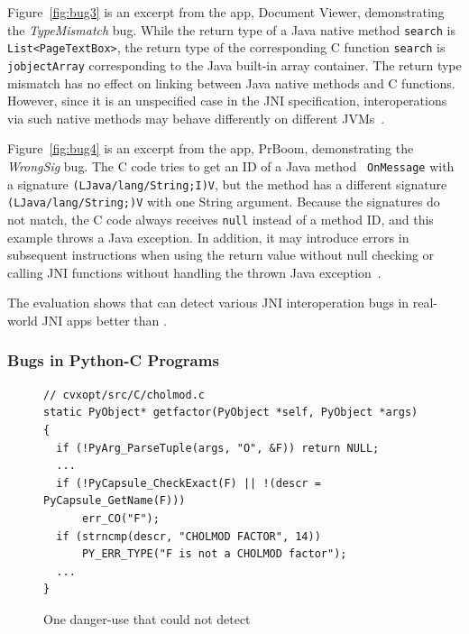 Figure~\ref{fig:bug3} is an excerpt from the app, Document Viewer,
demonstrating the {\it TypeMismatch} bug.  While the return type of a Java
native method {\tt search} is {\tt List<PageTextBox>}, the return type of the
corresponding C function {\tt search} is {\tt jobjectArray} corresponding to
the Java built-in array container. The return type mismatch has no effect on
linking between Java native methods and C functions. However, since it is an
unspecified case in the JNI specification, interoperations via such native
methods may behave differently on different JVMs~\cite{LeeASE20}.


Figure~\ref{fig:bug4} is an excerpt from the app, PrBoom, demonstrating the
{\it WrongSig} bug.  The C code tries to get an ID of a Java method {\tt
OnMessage} with a signature \texttt{(LJava/lang/String;I)V}, but the method has
a different signature \texttt{(LJava/lang/String;)V} with one String argument.
Because the signatures do not match, the C code always receives {\tt null}
instead of a method ID, and this example throws a Java exception. In addition,
it may introduce errors in subsequent instructions when using the return value
without null checking or calling JNI functions without handling the thrown Java
exception~\cite{jniexcept}.

The evaluation shows that \ours can detect various JNI interoperation bugs in
real-world JNI apps better than \lees.

\subsubsection{Bugs in Python-C Programs}


\begin{figure}[ht!]
  \centering
  \vspace{2mm}
  \begin{lstlisting}[style=cpp,xleftmargin=2.5em]
// cvxopt/src/C/cholmod.c
static PyObject* getfactor(PyObject *self, PyObject *args)
{
  if (!PyArg_ParseTuple(args, "O", &F)) return NULL;
  ...
  if (!PyCapsule_CheckExact(F) || !(descr = PyCapsule_GetName(F)))
      err_CO("F");
  if (strncmp(descr, "CHOLMOD FACTOR", 14))
      PY_ERR_TYPE("F is not a CHOLMOD factor");
  ...
}
  \end{lstlisting}
    \vspace*{-.5em}
  \caption{One danger-use that \ours could not detect}
  \label{fig:cvxopt}
\end{figure}


